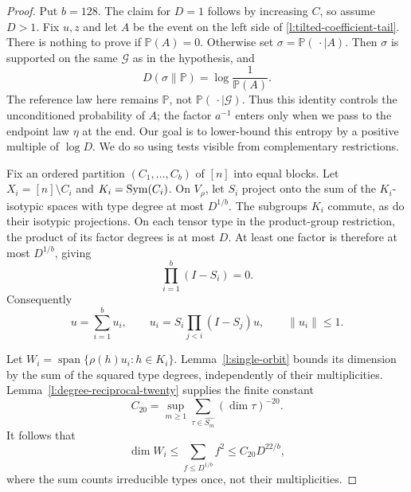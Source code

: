 \begin{proof}
Put $b=128$. The claim for $D=1$ follows by increasing $C$, so assume
$D>1$. Fix $u,z$ and let $A$ be the event on the left side of
\eqref{l:tilted-coefficient-tail}. There is nothing to prove if
$\mathbb P(A)=0$. Otherwise set $\sigma=\mathbb P(\,\cdot\mid A)$.
Then $\sigma$ is supported on the same $\mathcal G$ as in the hypothesis,
and
\begin{equation}
 D(\sigma\|\mathbb P)=\log\frac1{\mathbb P(A)}.
 \label{l:tilted-conditioning-entropy}
\end{equation}
The reference law here remains $\mathbb P$, not
$\mathbb P(\,\cdot\mid\mathcal G)$. Thus this identity controls
the unconditioned probability of $A$; the factor $a^{-1}$ enters
only when we pass to the endpoint law $\eta$ at the end.
Our goal is to lower-bound this entropy by a positive multiple of
$\log D$. We do so using tests visible from complementary restrictions.

Fix an ordered partition $(C_1,\ldots,C_b)$ of $[n]$ into equal blocks.
Let $X_i=[n]\setminus C_i$ and $K_i=\operatorname{Sym}(C_i)$. On $V_\rho$, let
$S_i$ project onto the sum of the $K_i$-isotypic spaces with type degree
at most $D^{1/b}$. The subgroups $K_i$ commute, as do their isotypic
projections. On each tensor type in the product-group restriction, the
product of its factor degrees is at most $D$. At least one factor is
therefore at most $D^{1/b}$, giving
\[
 \prod_{i=1}^b(I-S_i)=0.
\]
Consequently
\begin{equation}
 u=\sum_{i=1}^b u_i,\qquad
 u_i=S_i\prod_{j<i}(I-S_j)u,\qquad \|u_i\|\le1.
 \label{l:tilted-vector-split}
\end{equation}

Let $W_i=\operatorname{span}\{\rho(h)u_i:h\in K_i\}$.
Lemma~\ref{l:single-orbit} bounds its dimension by the sum of the
squared type degrees, independently of their multiplicities.
Lemma~\ref{l:degree-reciprocal-twenty} supplies the finite constant
\[
 C_{20}=\sup_{m\ge1}
        \sum_{\tau\in\widehat{S_m}}(\dim\tau)^{-20}.
\]
It follows that
\begin{equation}
 \dim W_i\le\sum_{f\le D^{1/b}}f^2
       \le C_{20}D^{22/b},
 \label{l:tilted-orbit-rank}
\end{equation}
where the sum counts irreducible types once, not their multiplicities.


\end{proof}
